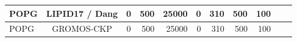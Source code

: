 \documentclass[journal=jpcbfk]{achemso}
\begin{document}
\begin{table}[htb]
\begin{minipage}[t]{\textwidth}
{\begin{tabular}{l c c r r r r r r c c}
      \hline
      POPG             & LIPID17 / Dang \cite{gould18,smith94,dang06}         & 0              & 500 & 25000 & 0   &  310  & 500 & 100 & \cite{POPGlipid17} \\
      \hline
      POPG             & GROMOS-CKP \cite{??}         & 0              & 500 & 25000 & 0  &  310  & 500 & 100 & \cite{POPGgromosCKP} \\
    \end{tabular}
    }
  \end{minipage}
\end{table}
\end{document}
